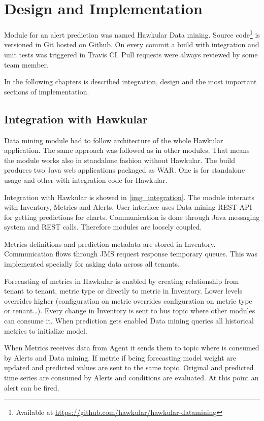 \chapter{Design and Implementation}
Module for an alert prediction was named Hawkular Data mining. Source
code\footnote{Available at \url{https://github.com/hawkular/hawkular-datamining}} is versioned in Git
hosted on Github. On every commit a build with integration and unit tests was triggered in
Travis CI. Pull requests were always reviewed by some team member.

In the following chapters is described integration, design and the most important
sections of implementation.

    \section{Integration with Hawkular}  
    Data mining module had to follow architecture of the whole Hawkular application.
    The same approach was followed as in other modules. That means the module 
    works also in standalone fashion without Hawkular. The build produces two Java
    web applications packaged as WAR. One is for standalone usage and other with
    integration code for Hawkular.

    Integration with Hawkular is showed in \ref{img_integration}.
    The module interacts with Inventory, Metrics and Alerts. User interface uses Data
    mining REST API for getting predictions for charts. Communication is done through 
    Java messaging system and REST calls. Therefore modules are
    loosely coupled.

    Metrics definitions and prediction metadata are stored in Inventory.
    Communication flows through JMS request response temporary queues. This was
    implemented specially for asking data across all tenants.

    Forecasting of 
    metrics in Hawkular is enabled by creating relationship from tenant to tenant, metric type
    or directly to metric in Inventory. Lower levels overrides higher (configuration on metric overrides
    configuration on metric type or tenant\dots). Every change in Inventory is sent to bus topic
    where other modules can consume it. When prediction gets enabled Data mining queries all
    historical metrics to initialize model.

    When Metrics receives data from Agent it sends them to topic where is consumed by Alerts
    and Data mining. If metric if being forecasting model weight are updated and predicted
    values are sent to the same topic. Original and predicted time series are consumed by 
    Alerts and conditions are evaluated. At this point an alert can be fired. 

